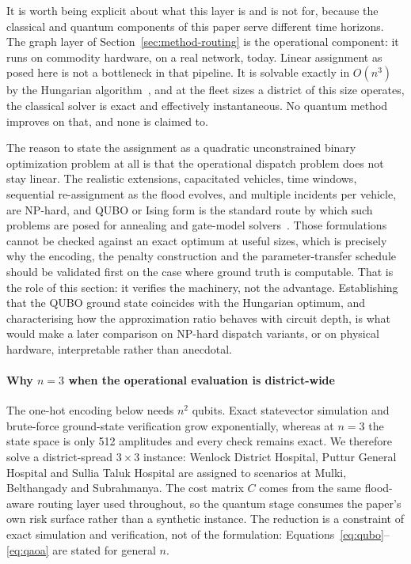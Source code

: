 \documentclass[10pt,twocolumn]{article}
\begin{document}
It is worth being explicit about what this layer is and is not for, because the
classical and quantum components of this paper serve different time horizons. The
graph layer of Section~\ref{sec:method-routing} is the operational component: it
runs on commodity hardware, on a real network, today. Linear assignment as posed
here is not a bottleneck in that pipeline. It is solvable exactly in $O(n^3)$ by
the Hungarian algorithm~\citep{kuhn1955}, and at the fleet sizes a district of
this size operates, the classical solver is exact and effectively instantaneous.
No quantum method improves on that, and none is claimed to.

The reason to state the assignment as a quadratic unconstrained binary
optimization problem at all is that the operational dispatch problem does not stay
linear. The realistic extensions, capacitated vehicles, time windows, sequential
re-assignment as the flood evolves, and multiple incidents per vehicle, are
NP-hard, and QUBO or Ising form is the standard route by which such problems are
posed for annealing and gate-model
solvers~\citep{lucas2014,glover2019,fitzek2024}. Those formulations cannot be
checked against an exact optimum at useful sizes, which is precisely why the
encoding, the penalty construction and the parameter-transfer schedule should be
validated first on the case where ground truth is computable. That is the role of
this section: it verifies the machinery, not the advantage. Establishing that the
QUBO ground state coincides with the Hungarian optimum, and characterising how
the approximation ratio behaves with circuit depth, is what would make a later
comparison on NP-hard dispatch variants, or on physical hardware, interpretable
rather than anecdotal.

\paragraph{Why $n=3$ when the operational evaluation is district-wide}
The one-hot encoding below needs $n^2$ qubits. Exact statevector simulation and
brute-force ground-state verification grow exponentially, whereas at $n=3$ the
state space is only 512 amplitudes and every check remains exact. We therefore
solve a district-spread $3\times3$ instance: Wenlock District Hospital, Puttur
General Hospital and Sullia Taluk Hospital are assigned to scenarios at Mulki,
Belthangady and Subrahmanya. The cost matrix $C$ comes from the same flood-aware
routing layer used throughout, so the quantum stage consumes the paper's own
risk surface rather than a synthetic instance. The reduction is a constraint of
exact simulation and verification, not of the formulation:
Equations~\eqref{eq:qubo}--\eqref{eq:qaoa} are stated for general $n$.
\end{document}
